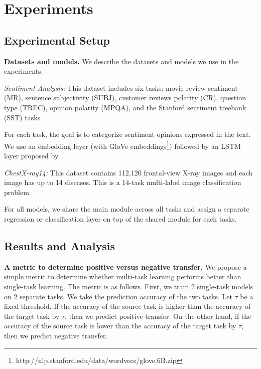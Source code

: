 \section{Experiments}

\subsection{Experimental Setup}

{\bf Datasets and models.} We describe the datasets and models we use in the experiments.

{\it Sentiment Analysis:} This dataset includes six tasks: movie review sentiment (MR), sentence subjectivity (SUBJ), customer reviews polarity (CR), question type (TREC), opinion polarity (MPQA), and the Stanford sentiment treebank (SST) tasks.

{For each task, the goal is to categorize sentiment opinions expressed in the text.
We use an embedding layer (with GloVe embeddings\footnote{http://nlp.stanford.edu/data/wordvecs/glove.6B.zip}) followed by an LSTM layer proposed by~\cite{lei2018simple}.
}

{\it ChestX-ray14:} This dataset contains 112,120 frontal-view X-ray images and each image has up to 14 diseases.
This is a 14-task multi-label image classification problem.

For all models, we share the main module across all tasks and assign a separate regression or classification layer on top of the shared module for each tasks.



\subsection{Results and Analysis}

\textbf{A metric to determine positive versus negative transfer.}
We propose a simple metric to determine whether multi-task learning performs better than single-task learning.
The metric is as follows.
First, we train 2 single-task models on 2 separate tasks.
We take the prediction accuracy of the two tasks.
Let $\tau$ be a fixed threshold.
If the accuracy of the source task is higher than the accuracy of the target task by $\tau$, then we predict positive transfer.
On the other hand, if the accuracy of the source task is lower than the accuracy of the target task by $\tau$, then we predict negative transfer.

